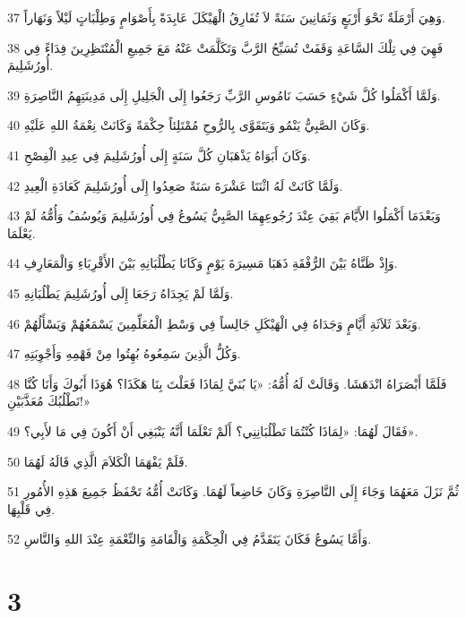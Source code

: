 \par 37 وَهِيَ أَرْمَلَةٌ نَحْوَ أَرْبَعٍ وَثَمَانِينَ سَنَةً لاَ تُفَارِقُ الْهَيْكَلَ عَابِدَةً بِأَصْوَامٍ وَطِلْبَاتٍ لَيْلاً وَنَهَاراً.
\par 38 فَهِيَ فِي تِلْكَ السَّاعَةِ وَقَفَتْ تُسَبِّحُ الرَّبَّ وَتَكَلَّمَتْ عَنْهُ مَعَ جَمِيعِ الْمُنْتَظِرِينَ فِدَاءً فِي أُورُشَلِيمَ.
\par 39 وَلَمَّا أَكْمَلُوا كُلَّ شَيْءٍ حَسَبَ نَامُوسِ الرَّبِّ رَجَعُوا إِلَى الْجَلِيلِ إِلَى مَدِينَتِهِمُ النَّاصِرَةِ.
\par 40 وَكَانَ الصَّبِيُّ يَنْمُو وَيَتَقَوَّى بِالرُّوحِ مُمْتَلِئاً حِكْمَةً وَكَانَتْ نِعْمَةُ اللهِ عَلَيْهِ.
\par 41 وَكَانَ أَبَوَاهُ يَذْهَبَانِ كُلَّ سَنَةٍ إِلَى أُورُشَلِيمَ فِي عِيدِ الْفِصْحِ.
\par 42 وَلَمَّا كَانَتْ لَهُ اثْنَتَا عَشْرَةَ سَنَةً صَعِدُوا إِلَى أُورُشَلِيمَ كَعَادَةِ الْعِيدِ.
\par 43 وَبَعْدَمَا أَكْمَلُوا الأَيَّامَ بَقِيَ عِنْدَ رُجُوعِهِمَا الصَّبِيُّ يَسُوعُ فِي أُورُشَلِيمَ وَيُوسُفُ وَأُمُّهُ لَمْ يَعْلَمَا.
\par 44 وَإِذْ ظَنَّاهُ بَيْنَ الرُّفْقَةِ ذَهَبَا مَسِيرَةَ يَوْمٍ وَكَانَا يَطْلُبَانِهِ بَيْنَ الأَقْرِبَاءِ وَالْمَعَارِفِ.
\par 45 وَلَمَّا لَمْ يَجِدَاهُ رَجَعَا إِلَى أُورُشَلِيمَ يَطْلُبَانِهِ.
\par 46 وَبَعْدَ ثَلاَثَةِ أَيَّامٍ وَجَدَاهُ فِي الْهَيْكَلِ جَالِساً فِي وَسْطِ الْمُعَلِّمِينَ يَسْمَعُهُمْ وَيَسْأَلُهُمْ.
\par 47 وَكُلُّ الَّذِينَ سَمِعُوهُ بُهِتُوا مِنْ فَهْمِهِ وَأَجْوِبَتِهِ.
\par 48 فَلَمَّا أَبْصَرَاهُ انْدَهَشَا. وَقَالَتْ لَهُ أُمُّهُ: «يَا بُنَيَّ لِمَاذَا فَعَلْتَ بِنَا هَكَذَا؟ هُوَذَا أَبُوكَ وَأَنَا كُنَّا نَطْلُبُكَ مُعَذَّبَيْنِ!»
\par 49 فَقَالَ لَهُمَا: «لِمَاذَا كُنْتُمَا تَطْلُبَانِنِي؟ أَلَمْ تَعْلَمَا أَنَّهُ يَنْبَغِي أَنْ أَكُونَ فِي مَا لأَبِي؟».
\par 50 فَلَمْ يَفْهَمَا الْكَلاَمَ الَّذِي قَالَهُ لَهُمَا.
\par 51 ثُمَّ نَزَلَ مَعَهُمَا وَجَاءَ إِلَى النَّاصِرَةِ وَكَانَ خَاضِعاً لَهُمَا. وَكَانَتْ أُمُّهُ تَحْفَظُ جَمِيعَ هَذِهِ الأُمُورِ فِي قَلْبِهَا.
\par 52 وَأَمَّا يَسُوعُ فَكَانَ يَتَقَدَّمُ فِي الْحِكْمَةِ وَالْقَامَةِ وَالنِّعْمَةِ عِنْدَ اللهِ وَالنَّاسِ.

\chapter{3}

